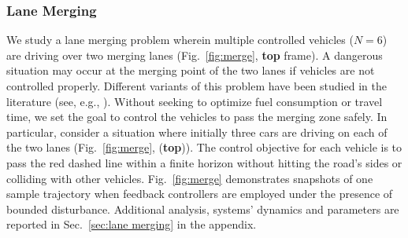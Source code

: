 \subsubsection{Lane Merging}
\label{subsec:lane merging}
We study a lane merging problem wherein multiple
controlled vehicles ($N=6$) are driving over two merging lanes (Fig.~\ref{fig:merge}, \textbf{top} frame). 
A dangerous situation may occur at the merging point of the two lanes if vehicles are not controlled properly. 
Different variants of this problem have been studied in the literature (see, e.g., \cite{xiao2019merging,xiao2020merging}). Without seeking to optimize fuel consumption or travel time, we set the goal to control the vehicles to pass the merging zone safely. In particular, consider a situation where initially three cars are driving on each of the two lanes (Fig.~\ref{fig:merge}, (\textbf{top})). The control objective for each vehicle is to pass the red dashed line within a finite horizon without hitting the road's sides or colliding with other vehicles. Fig.~\ref{fig:merge} demonstrates snapshots of one sample trajectory when feedback controllers are employed under the presence of bounded disturbance. Additional analysis, systems' dynamics and parameters are reported in Sec.~\ref{sec:lane merging} in the appendix.

